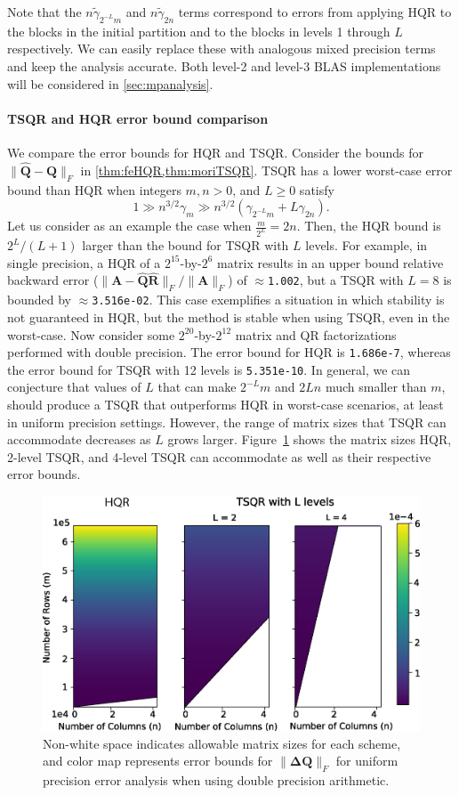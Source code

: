 \documentclass[review,onefignum,onetabnum]{siamart190516}
\newcommand{\bb}[1]{\mathbf{#1}}
\begin{document}
Note that the $n\tilde{\gamma}_{2^{-L}m}$ and $n\tilde{\gamma}_{ 2n}$ terms correspond to errors from applying HQR to the blocks in the initial partition and to the blocks in levels 1 through $L$ respectively.
We can easily replace these with analogous mixed precision terms and keep the analysis accurate.
Both level-2 and level-3 BLAS implementations will be considered in \cref{sec:mpanalysis}.
\paragraph{TSQR and HQR error bound comparison}
We compare the error bounds for HQR and TSQR. 
Consider the bounds for $\|\hat{\bb{Q}}-\bb{Q}\|_F$ in \cref{thm:feHQR,thm:moriTSQR}.
TSQR has a lower worst-case error bound than HQR when integers $m, n > 0$, and $L\geq0$ satisfy
\begin{equation*}
1\gg n^{3/2}\gamma_m \gg n^{3/2}(\gamma_{2^{-L}m}+L\gamma_{2n}).
\end{equation*}
Let us consider as an example the case when $\frac{m}{2^L}=2n$.
Then, the HQR bound is $2^L/(L+1)$ larger than the bound for TSQR with $L$ levels.
For example, in single precision, a HQR of a $2^{15}$-by-$2^6$ matrix results in an upper bound relative backward error ($\|\bb{A}-\hat{\bb{Q}}\hat{\bb{R}}\|_F/\|\bb{A}\|_F$) of $\approx${\tt1.002}, but a TSQR with $L=8$ is bounded by $\approx${\tt 3.516e-02}. 
This case exemplifies a situation in which stability is not guaranteed in HQR, but the method is stable when using TSQR, even in the worst-case. 
Now consider some $2^{20}$-by-$2^{12}$ matrix and QR factorizations performed with double precision.
The error bound for HQR is {\tt 1.686e-7}, whereas the error bound for TSQR with 12 levels is {\tt 5.351e-10}.
In general, we can conjecture that values of $L$ that can make $2^{-L}m$ and $2Ln$ much smaller than $m$, should produce a TSQR that outperforms HQR in worst-case scenarios, at least in uniform precision settings.
However, the range of matrix sizes that TSQR can accommodate decreases as $L$ grows larger.
Figure~\ref{fig:paramspace} shows the matrix sizes HQR, 2-level TSQR, and 4-level TSQR can accommodate as well as their respective error bounds.\par
\begin{figure}
	\centering
	\includegraphics[width=.45\textwidth]{./figures/paramspace.png}
	\caption{\label{fig:paramspace} Non-white space indicates allowable matrix sizes for each scheme, and color map represents error bounds for $\|\bb{\Delta Q}\|_F$ for uniform precision error analysis when using double precision arithmetic.}
	\vspace{-10pt}	
\end{figure}
\end{document}
